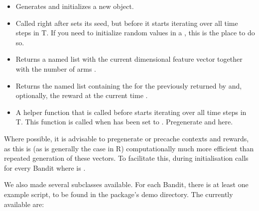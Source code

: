 \documentclass[nojss]{jss}\usepackage[]{graphicx}\usepackage[]{color}
\begin{document}
\begin{itemize}
  \item{}{ Generates and initializes a new  object. }
  \item{}{
     Called right after  sets its seed,
     but before it starts iterating over all time steps  in T. If you need to initialize random values in a ,
     this is the place to do so.
  }
  \item{}{
     Returns a named list 
     with the current  dimensional  feature vector  together with the number of arms .
 }
  \item{}{
     Returns the named list  containing the 
     for the  previously returned by  and,
     optionally, the  reward
     at the current time .
 }
  \item{}{
     A helper function that is called before  starts iterating over all time steps  in T.
     This function is called when  has been set to .
     Pregenerate  and  here.
  }
\end{itemize}

Where possible, it is advisable to pregenerate or precache  contexts and rewards, as this is (as is generally the case in R) computationally much more efficient than repeated generation of these vectors. To facilitate this, during initialisation  calls  for every Bandit where  is .

We also made several  subclasses available.  For each Bandit, there is at least one example script, to be found in the package’s demo directory. The currently available  are:
\end{document}
